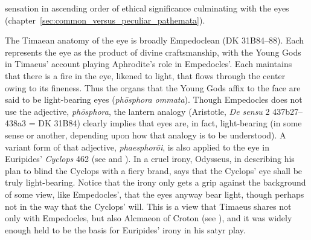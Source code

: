 sensation in ascending order of ethical significance culminating with the eyes (chapter~\ref{sec:common_versus_peculiar_pathemata}).

The Timaean anatomy of the eye is broadly Empedoclean (DK 31B84--88). Each represents the eye as the product of divine craftsmanship, with the Young Gods in Timaeus' account playing Aphrodite's role in Empedocles'. Each maintains that there is a fire in the eye, likened to light, that flows through the center owing to its fineness. Thus the organs that the Young Gods affix to the face are said to be light-bearing eyes (\emph{phōsphora ommata}). Though Empedocles does not use the adjective, \emph{phōsphora}, the lantern analogy (Aristotle, \emph{De sensu} 2 437b27–438a3 = DK 31B84) clearly implies that eyes are, in fact, light-bearing (in some sense or another, depending upon how that analogy is to be understood). A variant form of that adjective, \emph{phaesphorōi}, is also applied to the eye in Euripides' \emph{Cyclops} 462 (see \citealt[489-90]{Seaford:1984vb} and \citealt[114]{Johansen:2004dx}). In a cruel irony, Odysseus, in describing his plan to blind the Cyclops with a fiery brand, says that the Cyclops' eye shall be truly light-bearing. Notice that the irony only gets a grip against the background of some view, like Empedocles', that the eyes anyway bear light, though perhaps not in the way that the Cyclops' will. This is a view that Timaeus shares not only with Empedocles, but also Alcmaeon of Croton (see \citealt[11--13]{Beare:1906uq}), and it was widely enough held to be the basis for Euripides' irony in his satyr play.

